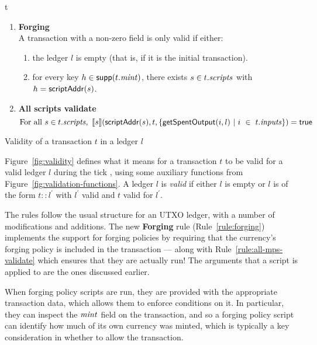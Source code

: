 \begin{ruledfigure}{t}
\begin{enumerate}
\item
  \label{rule:forging}
  \textbf{Forging}\\
  A transaction with a non-zero \mint{} field is only
  valid if either:
  \begin{enumerate}
  \item the ledger $l$ is empty (that is, if it is the initial transaction).
  \item \label{rule:custom-mint}
    for every key $h \in \mathsf{supp}(t.\mathit{mint})$, there
    exists $s \in t.\mathit{scripts}$ with
    $h = \mathsf{scriptAddr}(s)$.
  \end{enumerate}
  \medskip

\item
  \label{rule:all-mps-validate}
  \textbf{All scripts validate}
  \begin{displaymath}
    \textrm{For all } s \in t.\mathit{scripts},\ \llbracket s\rrbracket(\mathsf{scriptAddr}(s), t,
    \{\mathsf{getSpentOutput}(i, l) ~\vert~ i~\in~ t.\mathit{inputs}\}) = \textsf{true}
  \end{displaymath}

\end{enumerate}
\caption{Validity of a transaction $t$ in a ledger $l$}
\label{fig:validity}
\end{ruledfigure}
%
Figure~\ref{fig:validity} defines what it means for a transaction $t$ to be valid for a valid ledger $l$ during the tick \currentTick, using some auxiliary functions from Figure~\ref{fig:validation-functions}. A ledger $l$ is \textit{valid} if either $l$ is empty or $l$ is of the form $t::l^{\prime}$ with $l^{\prime}$ valid and $t$ valid for $l^{\prime}$.

The rules follow the usual structure for an UTXO ledger, with a number of modifications and additions.
The new \textbf{Forging} rule (Rule~\ref{rule:forging}) implements the support for forging policies by requiring that the currency's forging policy is included in the transaction --- along with Rule~\ref{rule:all-mps-validate} which ensures that they are actually run!
The arguments that a script is applied to are the ones discussed earlier.

When forging policy scripts are run, they are provided with the appropriate transaction data, which allows them to enforce conditions on it.
In particular, they can inspect the $\mathit{mint}$ field on the transaction, and so a forging policy script can identify how much of its own currency was minted, which is typically a key consideration in whether to allow the transaction.

